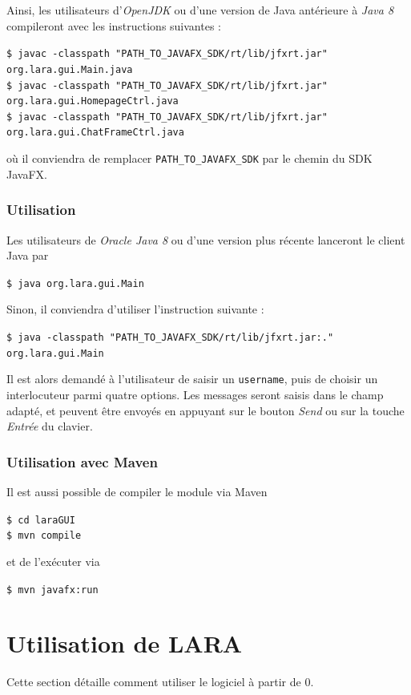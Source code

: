 \documentclass[10pt,a4paper]{article}
\begin{document}
Ainsi, les utilisateurs d'\textit{OpenJDK} ou d'une version de Java antérieure à \textit{Java 8} compileront avec les instructions suivantes :
\begin{center}
	\texttt{\$ javac -classpath "PATH\_TO\_JAVAFX\_SDK/rt/lib/jfxrt.jar" org.lara.gui.Main.java} \\
	\texttt{\$ javac -classpath "PATH\_TO\_JAVAFX\_SDK/rt/lib/jfxrt.jar" org.lara.gui.HomepageCtrl.java} \\
	\texttt{\$ javac -classpath "PATH\_TO\_JAVAFX\_SDK/rt/lib/jfxrt.jar" org.lara.gui.ChatFrameCtrl.java}
\end{center}
où il conviendra de remplacer \texttt{PATH\_TO\_JAVAFX\_SDK} par le chemin du SDK JavaFX.

\subsubsection{Utilisation}

Les utilisateurs de \textit{Oracle Java 8} ou d'une version plus récente lanceront le client Java par
\begin{center}
	\texttt{\$ java org.lara.gui.Main}
\end{center}

Sinon, il conviendra d'utiliser l'instruction suivante :
\begin{center}
	\texttt{\$ java -classpath "PATH\_TO\_JAVAFX\_SDK/rt/lib/jfxrt.jar:." org.lara.gui.Main}
\end{center}

Il est alors demandé à l'utilisateur de saisir un \texttt{username}, puis de choisir un interlocuteur parmi quatre options. Les messages seront saisis dans le champ adapté, et peuvent être envoyés en appuyant sur le bouton \textit{Send} ou sur la touche \textit{Entrée} du clavier.

\subsubsection{Utilisation avec Maven}
Il est aussi possible de compiler le module via Maven
\begin{center}
	\texttt{\$ cd laraGUI} \\
	\texttt{\$ mvn compile}
\end{center}
et de l'exécuter via
\begin{center}
	\texttt{\$ mvn javafx:run}
\end{center}


\section{Utilisation de LARA}
Cette section détaille comment utiliser le logiciel à partir de 0.
\end{document}
